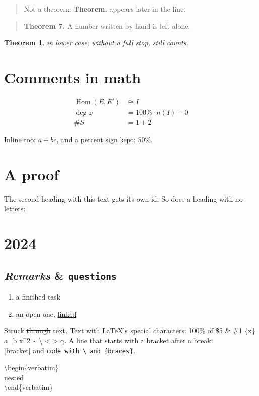 \documentclass{amsart}
\newtheorem{theorem}{Theorem}
\theoremstyle{definition}
\theoremstyle{remark}
\begin{document}
\begin{quote}
Not a theorem: \textbf{Theorem.} appears later in the line.

\end{quote}

\begin{quote}
\textbf{Theorem 7.} A number written by hand is left alone.

\end{quote}

\begin{theorem}
in lower case, without a full stop, still counts.

\end{theorem}

\section{Comments in math}\label{tn-h-comments-in-math}

\newcommand{\Hom}{\operatorname{Hom}}
\begin{align}
\Hom(E, E') &\cong I \label{eq:hom} \\ \deg \varphi &= 100\% \cdot n(I)
- 0 \\
\# S &= 1
+ 2
\end{align}

Inline too: \(a + b c\), and a percent sign kept: \(50\%\).

\section{A proof}\label{tn-h-a-proof-2}

The second heading with this text gets its own id. So does a heading with no letters:

\section{2024}\label{tn-h-2024}

\subsection{\emph{Remarks} \& \texttt{questions}}\label{tn-h-remarks-questions}

\begin{enumerate}
\item[$\boxtimes$] a finished task
\item[$\square$] an open one, \hyperref[tn-h-2024]{linked}
\end{enumerate}

Struck \sout{through} text. Text with LaTeX's special characters: 100\% of \$5 \& \#1 \{x\} a\_b x\textasciicircum{}2 \textasciitilde{} \textbackslash{} \textless{} \textgreater{} \textbar{} \textquotedbl{}q\textquotedbl{}.
A line that starts with a bracket after a break:\\
{[}bracket] and \texttt{code with \textbackslash{} and \{braces\}}.

{\ttfamily\noindent
\mbox{}\textbackslash{}begin\{verbatim\}\\
\mbox{}nested\\
\mbox{}\textbackslash{}end\{verbatim\}\\
\par}
\end{document}
